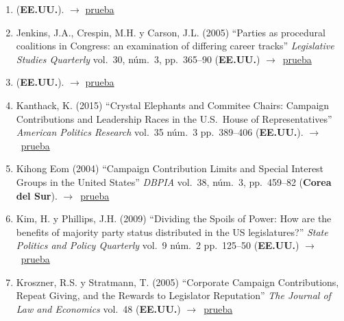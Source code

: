 \documentclass[12 pt, letter]{article}
\newenvironment{CitasMiTrabajo}{
    \begin{footnotesize}
    \begin{enumerate}[label={\footnotesize\emph{cita~\arabic*}},ref=\arabic*] %
        \setlength{\itemsep}{.1\itemsep}
        \setlength{\parskip}{.1\parskip}
    }{\end{enumerate}\end{footnotesize}}
\begin{document}
\begin{CitasMiTrabajo}
        \item {} (\textbf{EE.UU.}). $\rightarrow$ \href{https://books.google.com.mx/books?hl=en&lr=&id=hdiuDwAAQBAJ&oi=fnd&pg=PP1&dq=The+politics+of+congressional+elections&ots=U2ybkSHKTz&sig=HTYVUMbzZazF0A05uXBHOGKjR58&redir_esc=y#v=onepage&q=The%20politics%20of%20congressional%20elections&f=false}{prueba}
          
        \item Jenkins, J.A., Crespin, M.H. y Carson, J.L. (2005)
        ``Parties as procedural coalitions in Congress: an examination of differing career tracks''
        \emph{Legislative Studies Quarterly} vol.\ 30, n\'um.\ 3, pp.\ 365--90  (\textbf{EE.UU.}) $\rightarrow$~\href{https://github.com/emagar/cv/blob/master/citasMiTrab/coxMagar/jenkinsetal2005lsq.pdf}{prueba}

        \item {} (\textbf{EE.UU.}). $\rightarrow$ \href{https://github.com/emagar/cv/blob/master/citasMiTrab/coxMagar/jenkins.monroeBuyNegAgenda2012ajps.pdf}{prueba}

        \item Kanthack, K. (2015) ``Crystal Elephants and Commitee Chairs: Campaign Contributions and Leadership Races in the U.S.\ House of Representatives'' \emph{American Politics Research} vol.\ 35 n\'um.\ 3 pp.\ 389--406 (\textbf{EE.UU.}). $\rightarrow$~\href{https://github.com/emagar/cv/blob/master/citasMiTrab/coxMagar/kanthak.ContributionsChairs2007apr.pdf}{prueba}

        \item Kihong Eom (2004)
        ``Campaign Contribution
        Limits and Special Interest Groups in the United States'' \emph{DBPIA} vol.\
        38, n\'um.\ 3, pp.\ 459--82  (\textbf{Corea del Sur}). $\rightarrow$~\href{https://github.com/emagar/cv/blob/master/citasMiTrab/coxMagar/eom.pdf}{prueba}

       \item Kim, H. y Phillips, J.H. (2009) ``Dividing the Spoils of Power: How are the benefits of majority party status distributed in the US legislatures?'' \emph{State Politics and Policy Quarterly} vol.\ 9 n\'um.\ 2 pp.\ 125--50 (\textbf{EE.UU.}) $\rightarrow$~\href{https://github.com/emagar/cv/blob/master/citasMiTrab/coxMagar/kim+philips.pdf}{prueba}

        \item Kroszner, R.S. y Stratmann, T. (2005)
        ``Corporate Campaign Contributions, Repeat Giving, and the Rewards to
        Legislator Reputation''
        \emph{The Journal of Law and Economics} vol.\ 48 (\textbf{EE.UU.}) $\rightarrow$~\href{https://github.com/emagar/cv/blob/master/citasMiTrab/coxMagar/kros.pdf}{prueba}


\end{CitasMiTrabajo}
\end{document}
